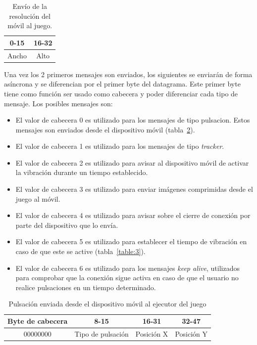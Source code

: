 \begin{table}[h!]
\centering
\begin{tabular}{|c|c|} 
\hline
0-15                   & 16-32                   \\
\hline
 \multicolumn{1}{|c|}{Ancho} & \multicolumn{1}{c|}{Alto}  \\
\hline
\end{tabular}
\caption{Env\'io de la resoluci\'on del m\'ovil al juego.}
\label{table:1}
\end{table}

Una vez los 2 primeros mensajes son enviados, los siguientes se enviar\'an de forma as\'incrona y se diferencian por el primer byte del datagrama. Este primer byte tiene como funci\'on ser usado como cabecera y poder diferenciar cada tipo de mensaje. Los posibles mensajes son:\\

\begin {itemize}
\item El valor de cabecera 0 es utilizado para los mensajes de tipo pulsacion. Estos mensajes son enviados desde el dispositivo m\'ovil (tabla~\ref{table:2}).
\item  El valor de cabecera 1 es utilizado para los mensajes de tipo \textit{tracker}. 
\item  El valor de cabecera 2 es utilizado para avisar al dispositivo m\'ovil de activar la vibraci\'on durante un tiempo establecido.
\item  El valor de cabecera 3 es utilizado para enviar im\'agenes comprimidas desde el juego al m\'ovil.
\item  El valor de cabecera 4 es utilizado para avisar sobre el cierre de conexi\'on por parte del dispositivo que lo env\'ia.
\item  El valor de cabecera 5 es utilizado para establecer el tiempo de vibraci\'on en caso de que este se active (tabla~\ref{table:3}).
\item  El valor de cabecera 6 es utilizado para los mensajes \textit{keep alive}, utilizados para comprobar que la conexi\'on sigue activa en caso de que el usuario no realice pulsaciones en un tiempo determinado.
\end {itemize}


\begin{table}[h!]
\centering
\begin{tabular}{|c|c|c|c|} 
\hline
Byte de cabecera                   & 8-15                            & 16-31 & 32-47 \\ 
\hline
\multicolumn{1}{|c|}{00000000} & Tipo de pulsaci\'on & \multicolumn{1}{c|}{Posici\'on X} & \multicolumn{1}{c|}{Posici\'on Y}  \\
\hline
\end{tabular}
\caption{Pulsaci\'on enviada desde el dispositivo m\'ovil al ejecutor del juego}
\label{table:2}
\end{table}

